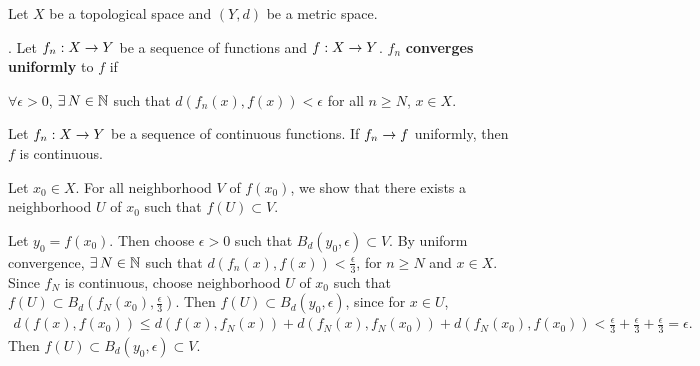 \medskip

Let \(X\) be a topological space and \((Y, d)\) be a metric space.

.  Let \(f_n : X \rightarrow Y\) be a sequence of functions and \(f : X \rightarrow Y\).
\(f_n\) \textbf{converges uniformly} to \(f\) if
\begin{center}
    \(\forall \epsilon > 0\), \(\exists N \in \N\) such that \(d(f_n(x), f(x)) < \epsilon\) for all \(n \geq N\), \(x \in X\).
\end{center}

  Let \(f_n : X \rightarrow Y\) be a sequence of continuous functions. If \(f_n \rightarrow f\) uniformly, then \(f\) is continuous.

\pf Let \(x_0 \in X\). For all neighborhood \(V\) of \(f(x_0)\), we show that there exists a neighborhood \(U\) of \(x_0\) such that \(f(U) \subset V\).

Let \(y_0 = f(x_0)\). Then choose \(\epsilon > 0\) such that \(B_d(y_0, \epsilon) \subset V\). By uniform convergence, \(\exists N \in \N\) such that \(d(f_n(x), f(x)) < \frac{\epsilon}{3}\), for \(n \geq N\) and \(x \in X\). Since \(f_N\) is continuous, choose neighborhood \(U\) of \(x_0\) such that \(f(U) \subset B_d(f_N(x_0), \frac{\epsilon}{3})\). Then \(f(U) \subset B_d(y_0, \epsilon)\), since for \(x \in U\),
\[
    \begin{aligned}
        d(f(x), f(x_0)) \leq d(f(x), f_N(x)) + d(f_N(x), f_N(x_0)) + d(f_N(x_0), f(x_0)) < \frac{\epsilon}{3} + \frac{\epsilon}{3} + \frac{\epsilon}{3} = \epsilon.
    \end{aligned}
\]
Then \(f(U) \subset B_d(y_0, \epsilon) \subset V\).

\pagebreak
